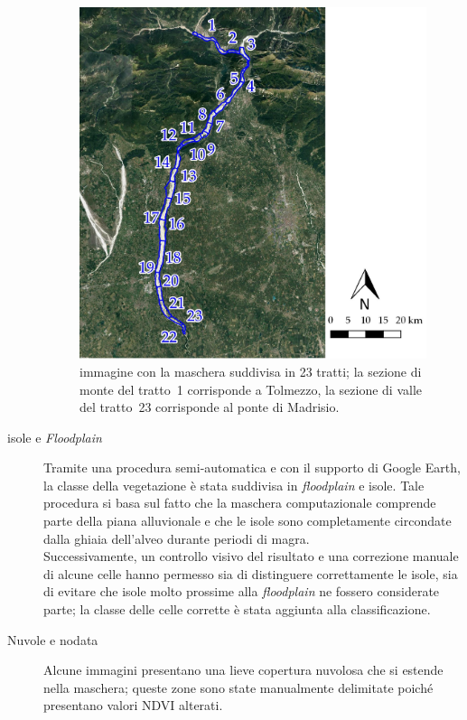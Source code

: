 \begin{description}
\begin{figure}
		\includegraphics[width=\textwidth]{files/tutti_23_tratti.jpeg}
		\caption[immagine con la maschera suddivisa in 23 tratti]{immagine con la maschera suddivisa in 23 tratti; la sezione di monte del tratto~1 corrisponde a Tolmezzo, la sezione di valle del tratto~23 corrisponde al ponte di Madrisio.}
		\label{fig:23-tratti}
	\end{figure}
	\item[isole e \emph{Floodplain}]
	Tramite una procedura semi-automatica e con il supporto di Google Earth, la classe della vegetazione è stata suddivisa in \emph{floodplain} e isole. 
	Tale procedura si basa sul fatto che la maschera computazionale comprende parte della piana alluvionale e che le isole sono completamente circondate dalla ghiaia dell'alveo durante periodi di magra.
	\\
	Successivamente, un controllo visivo del risultato e una correzione manuale di alcune celle hanno permesso sia di distinguere correttamente le isole, sia di evitare che isole molto prossime alla \emph{floodplain} ne fossero considerate parte; la classe delle celle corrette è stata aggiunta alla classificazione.
	\item[Nuvole e nodata] Alcune immagini presentano una lieve copertura nuvolosa che si estende nella maschera; queste zone sono state manualmente delimitate poiché presentano valori NDVI alterati.

\end{description}
